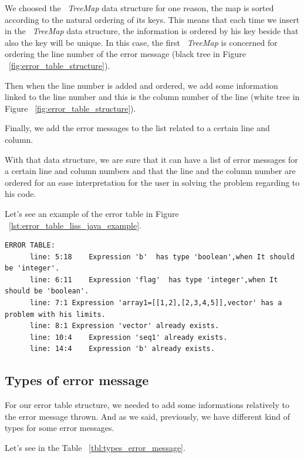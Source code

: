 \documentclass[
  oneside,
  11pt, a4paper,
  footinclude=true,
  headinclude=true,
  cleardoublepage=empty
]{scrbook}
\begin{document}
We choosed the ~\textit{TreeMap} data structure for one reason, the map is sorted according to the natural ordering of its keys.
This means that each time we insert in the ~\textit{TreeMap} data structure, the information is ordered by his key beside that also the key will be unique.
In this case, the first ~\textit{TreeMap} is concerned for ordering the line number of the error message (black tree in Figure ~\ref{fig:error_table_structure}).

Then when the line number is added and ordered, we add some information linked to the line number and this is the column number of the line (white tree in Figure ~\ref{fig:error_table_structure}).

Finally, we add the error messages to the list related to a certain line and column.

With that data structure, we are sure that it can have a list of error messages for a certain line and column numbers and that the line and the column number are ordered for an ease interpretation for the user in solving the problem regarding to his code.

Let's see an example of the error table in Figure ~\ref{lst:error_table_liss_java_example}.

\begin{lstlisting}[caption={Example of an error table},label={lst:error_table_liss_java_example}]
	ERROR TABLE:
	  line: 5:18	Expression 'b'  has type 'boolean',when It should be 'integer'.
	  line: 6:11	Expression 'flag'  has type 'integer',when It should be 'boolean'.
	  line: 7:1	Expression 'array1=[[1,2],[2,3,4,5]],vector' has a problem with his limits.
	  line: 8:1	Expression 'vector' already exists.
	  line: 10:4	Expression 'seq1' already exists.
	  line: 14:4	Expression 'b' already exists.
\end{lstlisting}

\subsection{Types of error message}

For our error table structure, we needed to add some informations relatively to the error message thrown.
And as we said, previously, we have different kind of types for some error messages.

Let's see in the Table ~\ref{tbl:types_error_message}.

\newpage
\end{document}
